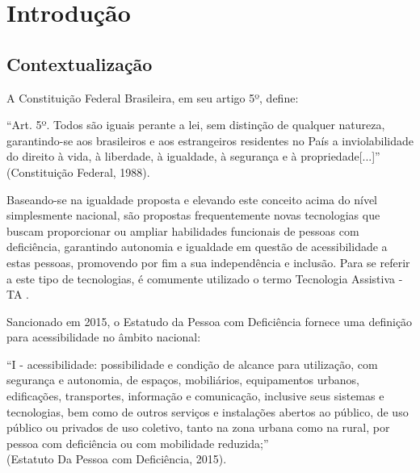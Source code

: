 \chapter{Introdução}

\label{CapIntro}


\section{Contextualização}

A Constituição Federal Brasileira, em seu artigo 5º, define:

\begin{quoting}[rightmargin=0cm,leftmargin=4cm]
{\footnotesize 
``Art. 5º. Todos são iguais perante a lei, sem distinção de qualquer natureza, garantindo-se aos brasileiros e aos estrangeiros residentes no 
País a inviolabilidade do direito à vida, à liberdade, à igualdade, à segurança e à propriedade[...]''
\\ (Constituição Federal, 1988)\cite{constituicao}.
}
\end{quoting}

Baseando-se na igualdade proposta e elevando este conceito acima do nível simplesmente nacional, são propostas frequentemente novas tecnologias que buscam proporcionar 
ou ampliar habilidades funcionais de pessoas com deficiência, garantindo autonomia e igualdade em questão de acessibilidade a estas pessoas, promovendo por 
fim a sua independência e inclusão. Para se referir a este tipo de tecnologias, é comumente utilizado o termo Tecnologia Assistiva - TA \cite{bersch2008introduccao}.  

Sancionado em 2015, o Estatudo da Pessoa com Deficiência fornece uma definição para acessibilidade no âmbito nacional:

\begin{quoting}[rightmargin=0cm,leftmargin=4cm]
{\footnotesize 
``I - acessibilidade: possibilidade e condição de alcance para utilização, com segurança e autonomia, de espaços, mobiliários, equipamentos urbanos, 
edificações, transportes, informação e comunicação, inclusive seus sistemas e tecnologias, bem como de outros serviços e instalações abertos ao público,
de uso público ou privados de uso coletivo, tanto na zona urbana como na rural, por pessoa com deficiência ou com mobilidade reduzida;''\\
(Estatuto Da Pessoa com Deficiência, 2015)\cite{estatutodef}.
}
\end{quoting}

